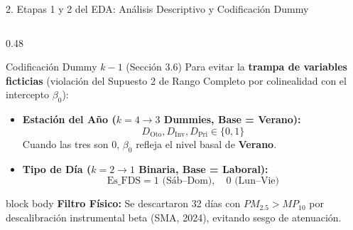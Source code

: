 \documentclass[aspectratio=169, 9pt]{beamer}
\begin{document}
\begin{frame}{2. Etapas 1 y 2 del EDA: Análisis Descriptivo y Codificación Dummy}
\begin{columns}[T]
  \begin{column}{0.48\textwidth}
    \begin{block}{\footnotesize Codificación Dummy $k-1$ (Sección 3.6)}
      \scriptsize
      Para evitar la \textbf{trampa de variables ficticias} (violación del Supuesto 2 de Rango Completo por colinealidad con el intercepto $\beta_0$):
      \begin{itemize}\setlength{\itemsep}{2pt}
        \item \textbf{Estación del Año ($k=4 \to 3$ Dummies, Base = Verano):}
        $$D_{\text{Oto}}, D_{\text{Inv}}, D_{\text{Pri}} \in \{0, 1\}$$
        Cuando las tres son $0$, $\beta_0$ refleja el nivel basal de \textbf{Verano}.
        \item \textbf{Tipo de Día ($k=2 \to 1$ Binaria, Base = Laboral):}
        $$\text{Es\_FDS} = 1 \text{ (Sáb--Dom)}, \quad 0 \text{ (Lun--Vie)}$$
      \end{itemize}
    \end{block}
    
    \begin{beamercolorbox}[wd=\textwidth, rounded=true, sep=2.5pt]{block body}
      \tiny\textbf{Filtro Físico:} Se descartaron 32 días con $PM_{2.5} > MP_{10}$ por descalibración instrumental beta (SMA, 2024), evitando sesgo de atenuación.
    \end{beamercolorbox}
  \end{column}
\end{columns}
\end{frame}
\end{document}
